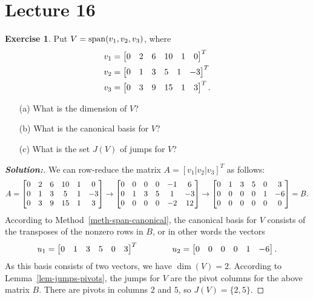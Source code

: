 \documentclass[a4paper]{amsart}
\theoremstyle{definition}
\newtheorem{exercise}{Exercise}
\newenvironment{solution}{\begin{proof}[\textbf{Solution:}] \vphantom{u}}{\end{proof}}
\begin{document}
\section{Lecture 16}

\begin{exercise}\label{ex-jumps-i}
 Put $V=\operatorname{span}(v_1,v_2,v_3)$, where
 \begin{align*}
  v_1 &= \left[\begin{matrix} 0&2&6&10&1&0 \end{matrix}\right]^T \\
  v_2 &= \left[\begin{matrix} 0&1&3&5&1&-3 \end{matrix}\right]^T \\
  v_3 &= \left[\begin{matrix} 0&3&9&15&1&3 \end{matrix}\right]^T.
 \end{align*}
 \begin{itemize}
  \item[(a)] What is the dimension of $V$?
  \item[(b)] What is the canonical basis for $V$?
  \item[(c)] What is the set $J(V)$ of jumps for $V$?
 \end{itemize}
\end{exercise}
\begin{solution}
 We can row-reduce the matrix $A=[v_1|v_2|v_3]^T$ as follows:
 \[ A =
    \left[\begin{matrix} 
     0&2&6&10&1&0 \\
     0&1&3&5&1&-3 \\
     0&3&9&15&1&3
    \end{matrix}\right]
    \to
    \left[\begin{matrix} 
     0&0&0&0&-1&6 \\
     0&1&3&5&1&-3 \\
     0&0&0&0&-2&12
    \end{matrix}\right]
    \to
    \left[\begin{matrix} 
     0&1&3&5&0& 3 \\
     0&0&0&0&1&-6 \\
     0&0&0&0&0&0
    \end{matrix}\right]
    = B.
 \]
 According to Method~\ref{meth-span-canonical}, the canonical basis
 for $V$ consists of the transposes of the nonzero rows in $B$, or in
 other words the vectors
 \[ u_1=\left[\begin{matrix} 0&1&3&5&0&3\end{matrix}\right]^T \hspace{4em}
    u_2=\left[\begin{matrix} 0&0&0&0&1&-6 \end{matrix}\right].
 \]
 As this basis consists of two vectors, we have $\dim(V)=2$.
 According to Lemma~\ref{lem-jumps-pivots}, the jumps for $V$ are the
 pivot columns for the above matrix $B$.  There are pivots in columns
 $2$ and $5$, so $J(V)=\{2,5\}$.
\end{solution}
\end{document}
